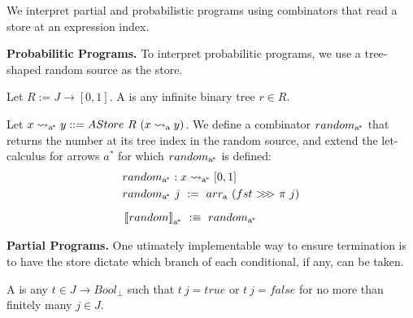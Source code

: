 \documentclass{llncs}
\renewcommand{\paragraph}[1]{\vspace{0.5\baselineskip}\noindent\textbf{{#1}.}\hspace{0.25\baselineskip}}
\newcommand{\arrow}{\rightsquigarrow}
\newcommand{\arrowarr}{\ensuremath{arr}}
\newcommand{\arrowcomp}{\ensuremath{{>}\mspace{-6mu}{>}\mspace{-6mu}{>}}}
\newcommand{\gen}{_\mathrm{a}}
\newcommand{\genc}{_\mathrm{a^{\mspace{-2mu}*}}}
\begin{document}
We interpret partial and probabilistic programs using combinators that read a store at an expression index.

\paragraph{Probabilitic Programs}
To interpret probabilitic programs, we use a tree-shaped random source as the store.

\begin{definition}
Let $R := J \to [0,1]$.
A  is any infinite binary tree $r \in R$.
\end{definition}

Let $x \arrow\genc y ::= AStore~R~(x \arrow\gen y)$.
We define a combinator $random\genc$ that returns the number at its tree index in the random source, and extend the let-calculus for arrows $a^*$ for which $random\genc$ is defined:
\begin{equation}
\begin{aligned}
	&random\genc : x \arrow\genc [0,1] \\
	&random\genc~j \ := \ \arrowarr\gen~(fst~\arrowcomp~\pi~j)
\\[6pt]
	&\meaningof{random}\genc \ :\equiv \ random\genc
\end{aligned}
\end{equation}

\paragraph{Partial Programs}
One utimately implementable way to ensure termination is to have the store dictate which branch of each conditional, if any, can be taken.

\begin{definition}
A  is any $t \in J \to Bool_\bot$ such that $t~j = true$ or $t~j = false$ for no more than finitely many $j \in J$.
\end{definition}
\end{document}
